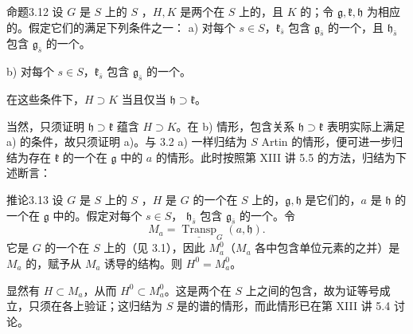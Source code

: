 \begin{SGAresult}{命题}{3.12}
设 $G$ 是 $S$ 上的 $S$ ，$H,K$ 是两个在 $S$ 上的，且 $K$ 的；令 $\mathfrak g,\mathfrak k,\mathfrak h$ 为相应的。假定它们的满足下列条件之一：
a) 对每个 $s\in S$，$\mathfrak k_{\bar s}$ 包含 $\mathfrak g_{\bar s}$ 的一个，且 $\mathfrak h_{\bar s}$ 包含 $\mathfrak g_{\bar s}$ 的一个。

b) 对每个 $s\in S$，$\mathfrak k_{\bar s}$ 包含 $\mathfrak g_{\bar s}$ 的一个。

在这些条件下，$H\supset K$ 当且仅当 $\mathfrak h\supset\mathfrak k$。
\end{SGAresult}
当然，只须证明 $\mathfrak h\supset\mathfrak k$ 蕴含 $H\supset K$。在 b) 情形，包含关系 $\mathfrak h\supset\mathfrak k$ 表明实际上满足 a) 的条件，故只须证明 a)。与 3.2 a) 一样归结为 $S$ Artin 的情形，便可进一步归结为存在 $\mathfrak k$ 的一个在 $\mathfrak g$ 中的 $a$ 的情形。此时按照第 XIII 讲 5.5 的方法，归结为下述断言：
\begin{SGAresult}{推论}{3.13}
设 $G$ 是 $S$ 上的 $S$ ，$H$ 是 $G$ 的一个在 $S$ 上的，$\mathfrak g,\mathfrak h$ 是它们的，$a$ 是 $\mathfrak h$ 的一个在 $\mathfrak g$ 中的。假定对每个 $s\in S$， $\mathfrak h_{\bar s}$ 包含 $\mathfrak g_{\bar s}$ 的一个。令
\[M_a=\underline{\operatorname{Transp}}_G(a,\mathfrak h).\]
它是 $G$ 的一个在 $S$ 上的（见 3.1），因此 $M_a^0$（$M_a$ 各中包含单位元素的之并）是 $M_a$ 的，赋予从 $M_a$ 诱导的结构。则 $H^0=M_a^0$。
\end{SGAresult}
显然有 $H\subset M_a$，从而 $H^0\subset M_a^0$。这是两个在 $S$ 上之间的包含，故为证等号成立，只须在各上验证；这归结为 $S$ 是的谱的情形，而此情形已在第 XIII 讲 5.4 讨论。
